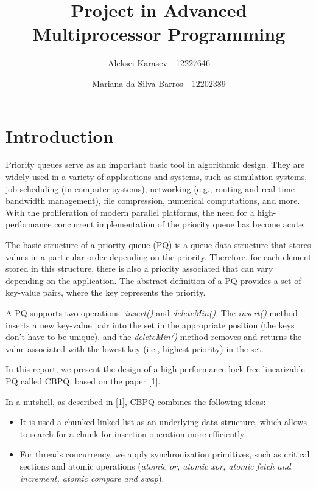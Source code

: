 \documentclass{article}
\begin{document}
  \title{Project in Advanced Multiprocessor Programming}
  \author[1]{Aleksei Karasev - 12227646}
  \author[2]{Mariana da Silva Barros - 12202389}

  \maketitle

  \section{Introduction}
  Priority queues serve as an important basic tool in algorithmic design.
  They are widely used in a variety of applications and systems, such as simulation systems, job scheduling (in computer systems), networking (e.g., routing and real-time bandwidth management), file compression, numerical computations, and more. With the proliferation of modern parallel platforms, the need for a high-performance concurrent implementation of the priority queue has become acute.\par

  The basic structure of a priority queue (PQ) is a queue data structure that stores values in a particular order depending on the priority. Therefore, for each element stored in this structure, there is also a priority associated that can vary depending on the application. The abstract definition of a PQ provides a set of key-value pairs, where the key represents the priority.\par

  A PQ supports two operations: \textit{insert()} and \textit{deleteMin()}. The \textit{insert()} method inserts a new key-value pair into the set in the appropriate position (the keys don't have to be unique), and the \textit{deleteMin()} method removes and returns the value associated with the lowest key (i.e., highest priority) in the set.\par

  In this report, we present the design of a high-performance lock-free linearizable PQ called CBPQ, based on the paper [1].\par
  In a nutshell, as described in [1], CBPQ combines the following ideas:

  \begin{itemize}
    \item{It is used a chunked linked list as an underlying data structure, which allows to search for a chunk for insertion operation more efficiently.}
    \item{For threads concurrency, we apply synchronization primitives, such as critical sections and atomic operations (\textit{atomic or, atomic xor, atomic fetch and increment, atomic compare and swap}).}
  \end{itemize}
\end{document}
